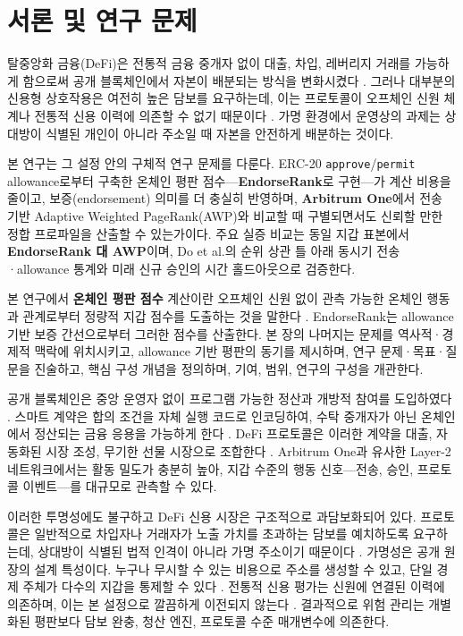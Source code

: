 \chapter{서론 및 연구 문제}
\label{ch:introduction}

탈중앙화 금융(DeFi)은 전통적 금융 중개자 없이 대출, 차입, 레버리지 거래를 가능하게 함으로써 공개 블록체인에서 자본이 배분되는 방식을 변화시켰다 . 그러나 대부분의 신용형 상호작용은 여전히 높은 담보를 요구하는데, 이는 프로토콜이 오프체인 신원 체계나 전통적 신용 이력에 의존할 수 없기 때문이다 . 가명 환경에서 운영상의 과제는 상대방이 식별된 개인이 아니라 주소일 때 자본을 안전하게 배분하는 것이다.

본 연구는 그 설정 안의 구체적 연구 문제를 다룬다. ERC-20 \texttt{approve}/\texttt{permit} allowance로부터 구축한 온체인 평판 점수---\textbf{EndorseRank}로 구현---가 계산 비용을 줄이고, 보증(endorsement) 의미를 더 충실히 반영하며, \textbf{Arbitrum One}에서 전송 기반 Adaptive Weighted PageRank(AWP)와 비교할 때 구별되면서도 신뢰할 만한 정합 프로파일을 산출할 수 있는가이다. 주요 실증 비교는 동일 지갑 표본에서 \textbf{EndorseRank 대 AWP}이며, Do et al.의 순위 상관 틀 아래 동시기 전송·allowance 통계와 미래 신규 승인의 시간 홀드아웃으로 검증한다.

본 연구에서 \textbf{온체인 평판 점수} 계산이란 오프체인 신원 없이 관측 가능한 온체인 행동과 관계로부터 정량적 지갑 점수를 도출하는 것을 말한다 . EndorseRank는 allowance 기반 보증 간선으로부터 그러한 점수를 산출한다. 본 장의 나머지는 문제를 역사적·경제적 맥락에 위치시키고, allowance 기반 평판의 동기를 제시하며, 연구 문제·목표·질문을 진술하고, 핵심 구성 개념을 정의하며, 기여, 범위, 연구의 구성을 개관한다.


공개 블록체인은 중앙 운영자 없이 프로그램 가능한 정산과 개방적 참여를 도입하였다 . 스마트 계약은 합의 조건을 자체 실행 코드로 인코딩하여, 수탁 중개자가 아닌 온체인에서 정산되는 금융 응용을 가능하게 한다 . DeFi 프로토콜은 이러한 계약을 대출, 자동화된 시장 조성, 무기한 선물 시장으로 조합한다 . Arbitrum One과 유사한 Layer-2 네트워크에서는 활동 밀도가 충분히 높아, 지갑 수준의 행동 신호---전송, 승인, 프로토콜 이벤트---를 대규모로 관측할 수 있다.

이러한 투명성에도 불구하고 DeFi 신용 시장은 구조적으로 과담보화되어 있다. 프로토콜은 일반적으로 차입자나 거래자가 노출 가치를 초과하는 담보를 예치하도록 요구하는데, 상대방이 식별된 법적 인격이 아니라 가명 주소이기 때문이다 . 가명성은 공개 원장의 설계 특성이다. 누구나 무시할 수 있는 비용으로 주소를 생성할 수 있고, 단일 경제 주체가 다수의 지갑을 통제할 수 있다 . 전통적 신용 평가는 신원에 연결된 이력에 의존하며, 이는 본 설정으로 깔끔하게 이전되지 않는다 . 결과적으로 위험 관리는 개별화된 평판보다 담보 완충, 청산 엔진, 프로토콜 수준 매개변수에 의존한다.

